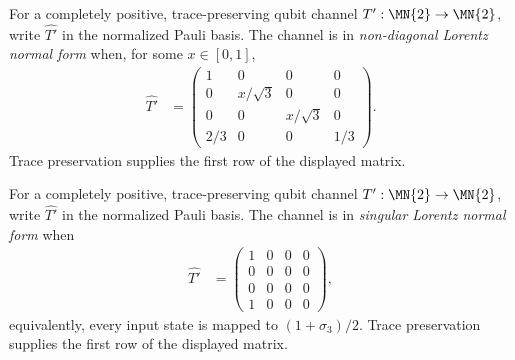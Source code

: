 \begin{definition}\label{def:lorentz_non_diagonal}
    \leanok
    For a completely positive, trace-preserving qubit channel
    $T' : \MN{2} \to \MN{2}$, write $\widehat{T'}$ in the normalized
    Pauli basis. The channel is in \emph{non-diagonal Lorentz normal form}
    when, for some $x \in [0,1]$,
    \begin{align}
        \widehat{T'}
        &=
        \begin{pmatrix}
            1   & 0          & 0          & 0   \\
            0   & x/\sqrt{3} & 0          & 0   \\
            0   & 0          & x/\sqrt{3} & 0   \\
            2/3 & 0          & 0          & 1/3
        \end{pmatrix}.
        \label{eq:representations_lorentz_nondiagonal}
    \end{align}
    Trace preservation supplies the first row of the displayed matrix.
\end{definition}

\begin{definition}\label{def:lorentz_singular}
    \leanok
    For a completely positive, trace-preserving qubit channel
    $T' : \MN{2} \to \MN{2}$, write $\widehat{T'}$ in the normalized
    Pauli basis. The channel is in \emph{singular Lorentz normal form} when
    \begin{align}
        \widehat{T'}
        &=
        \begin{pmatrix}
            1 & 0 & 0 & 0 \\
            0 & 0 & 0 & 0 \\
            0 & 0 & 0 & 0 \\
            1 & 0 & 0 & 0
        \end{pmatrix},
        \label{eq:representations_lorentz_singular}
    \end{align}
    equivalently, every input state is mapped to $(1+\sigma_{3})/2$.
    Trace preservation supplies the first row of the displayed matrix.
\end{definition}


